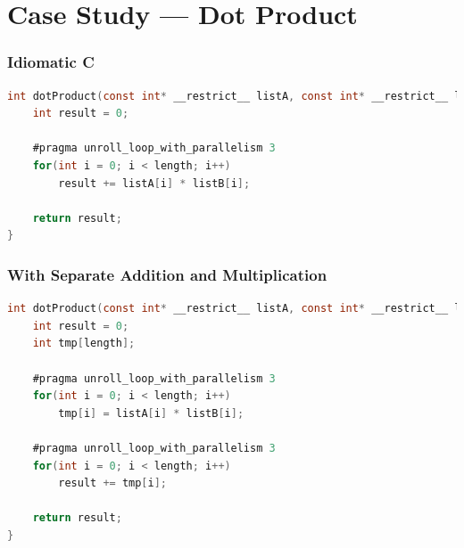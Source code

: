 \documentclass{beamer}
\begin{document}
\begin{frame}[t]
\end{frame}


\section{Case Study --- Dot Product}

\begin{frame}[fragile]
    \frametitle{Idiomatic C}

\begin{lstlisting}[language=C]
int dotProduct(const int* __restrict__ listA, const int* __restrict__ listB, int length){
    int result = 0;

    #pragma unroll_loop_with_parallelism 3
    for(int i = 0; i < length; i++)
        result += listA[i] * listB[i];

    return result;
}
\end{lstlisting}
\end{frame}

\begin{frame}[fragile]
    \frametitle{With Separate Addition and Multiplication}

\begin{lstlisting}[language=C]
int dotProduct(const int* __restrict__ listA, const int* __restrict__ listB, int length){
    int result = 0;
    int tmp[length];

    #pragma unroll_loop_with_parallelism 3
    for(int i = 0; i < length; i++)
        tmp[i] = listA[i] * listB[i];

    #pragma unroll_loop_with_parallelism 3
    for(int i = 0; i < length; i++)
        result += tmp[i];

    return result;
}
\end{lstlisting}
\end{frame}
\end{document}
